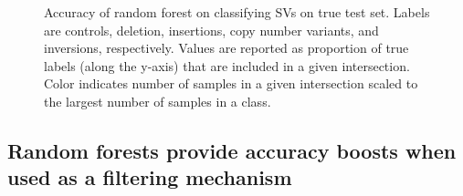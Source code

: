 \begin{figure}
    \centering
    \caption[Accuracy of random forest on classifying SVs on true test set.]{Accuracy of random forest on classifying SVs on true test set. Labels are controls, deletion, insertions, copy number variants, and inversions, respectively. Values are reported as proportion of true labels (along the y-axis) that are included in a given intersection. Color indicates number of samples in a given intersection scaled to the largest number of samples in a class.}
    \label{fig:test_accuracy_forest}
\end{figure}


\subsection{Random forests provide accuracy boosts when used as a filtering mechanism}

